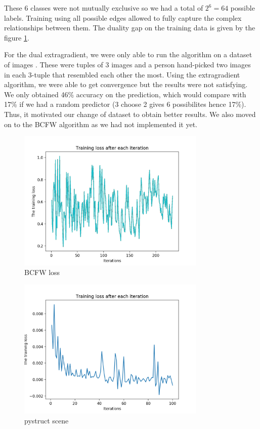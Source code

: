These 6 classes were not mutually exclusive so we had a total of $2^6=64$
possible labels. Training using all possible edges allowed to fully capture the
complex relationships between them. The duality gap on the training data is
given by the figure \ref{fig:bcfwLoss}.

For the dual extragradient, we were only able to run the algorithm on a dataset
of images \citet{vemulapalliCompactEmbeddingFacial2018}. These were tuples of 3 images and a person
hand-picked two images in each 3-tuple that resembled each other the most. Using the
extragradient algorithm, we were able to get convergence but the results were not 
satisfying. We only obtained 46\% accuracy on the prediction, which would compare 
with 17\% if we had a random predictor (3 choose 2 gives 6 possibilites hence 17\%).
Thus, it motivated our change of dataset to obtain better results. We also moved on to
the BCFW algorithm as we had not implemented it yet.

\begin{figure}[htbp!]
  \center
  \includegraphics[width=0.8\textwidth]{loss_bcfw.png}
  \caption{BCFW loss}
  \label{fig:bcfwLoss}
\end{figure} 
\begin{figure}[htbp!]
  \center
  \includegraphics[width=0.8\textwidth]{pystruct_scene.png}
  \caption{pystruct scene}
  \label{fig:pystruct}
\end{figure} 


